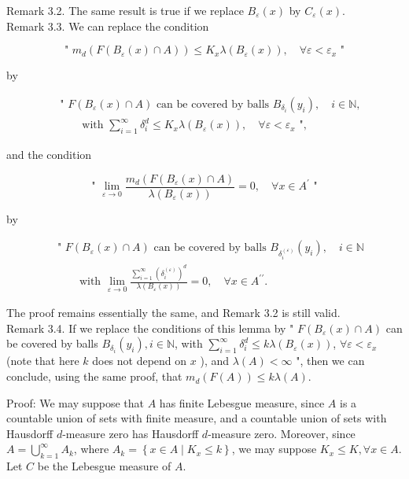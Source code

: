 \documentclass[10pt]{article}
\begin{document}
Remark 3.2. The same result is true if we replace $B_{\varepsilon}(x)$ by $C_{\varepsilon}(x)$.\\
Remark 3.3. We can replace the condition

$$
\text { " } m_{d}\left(F\left(B_{\varepsilon}(x) \cap A\right)\right) \leq K_{x} \lambda\left(B_{\varepsilon}(x)\right), \quad \forall \varepsilon<\varepsilon_{x} \text { " }
$$

by

$$
\begin{aligned}
& \text { " } F\left(B_{\varepsilon}(x) \cap A\right) \text { can be covered by balls } B_{\delta_{i}}\left(y_{i}\right), \quad i \in \mathbb{N}, \\
& \qquad \text { with } \sum_{i=1}^{\infty} \delta_{i}^{d} \leq K_{x} \lambda\left(B_{\varepsilon}(x)\right), \quad \forall \varepsilon<\varepsilon_{x} \text { ", }
\end{aligned}
$$

and the condition

$$
\text { " } \lim _{\varepsilon \rightarrow 0} \frac{m_{d}\left(F\left(B_{\varepsilon}(x) \cap A\right)\right.}{\lambda\left(B_{\varepsilon}(x)\right)}=0, \quad \forall x \in A^{\prime} \text { " }
$$

by

$$
\begin{aligned}
& \text { " } F\left(B_{\varepsilon}(x) \cap A\right) \text { can be covered by balls } B_{\delta_{i}^{(\varepsilon)}}\left(y_{i}\right), \quad i \in \mathbb{N} \\
& \qquad \text { with } \lim _{\varepsilon \rightarrow 0} \frac{\sum_{i=1}^{\infty}\left(\delta_{i}^{(\varepsilon)}\right)^{d}}{\lambda\left(B_{\varepsilon}(x)\right)}=0, \quad \forall x \in A^{\prime \prime} .
\end{aligned}
$$

The proof remains essentially the same, and Remark 3.2 is still valid.\\
Remark 3.4. If we replace the conditions of this lemma by " $F\left(B_{\varepsilon}(x) \cap A\right)$ can be covered by balls $B_{\delta_{i}}\left(y_{i}\right), i \in \mathbb{N}$, with $\sum_{i=1}^{\infty} \delta_{i}^{d} \leq k \lambda\left(B_{\varepsilon}(x)\right)$, $\forall \varepsilon<\varepsilon_{x}$ (note that here $k$ does not depend on $x$ ), and $\lambda(A)<\infty$ ", then we can conclude, using the same proof, that $m_{d}(F(A)) \leq k \lambda(A)$.

Proof: We may suppose that $A$ has finite Lebesgue measure, since $A$ is a countable union of sets with finite measure, and a countable union of sets with Hausdorff $d$-measure zero has Hausdorff $d$-measure zero. Moreover, since $A=\bigcup_{k=1}^{\infty} A_{k}$, where $A_{k}=\left\{x \in A \mid K_{x} \leq k\right\}$, we may suppose $K_{x} \leq K, \forall x \in A$. Let $C$ be the Lebesgue measure of $A$.
\end{document}
